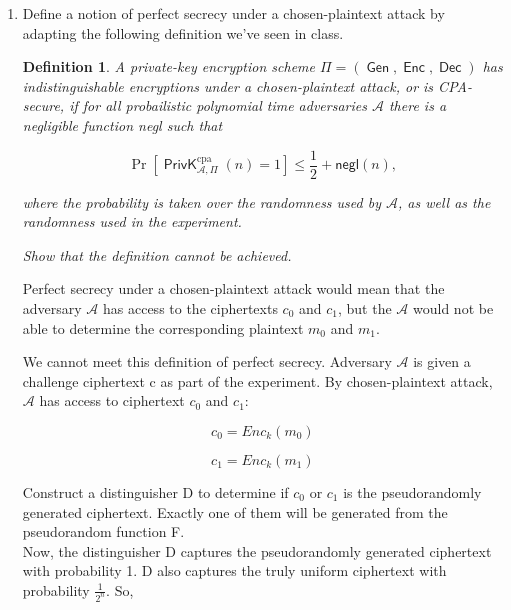 \documentclass{article}
\newtheorem{definition}{Definition}
\DeclareMathOperator{\PrivK}{\textsf{PrivK}}
\DeclareMathOperator{\Gen}{\textsf{Gen}}
\DeclareMathOperator{\Enc}{\textsf{Enc}}
\DeclareMathOperator{\Dec}{\textsf{Dec}}
\begin{document}
\begin{enumerate}
\begin{proof}
      Thus, we find an equivalent definition that $\mathcal{A}$ can only
      distinguish between the two encryption schemes with negligible
      probability.
    \end{proof}
  \item Define a notion of perfect secrecy under a chosen-plaintext attack by
    adapting the following definition we've seen in class.

    \begin{definition}
      \textit{A private-key encryption scheme $\Pi = (\Gen, \Enc,
        \Dec)$ has \textsf{indistinguishable encryptions under a
        chosen-plaintext attack}, or is \textsf{CPA-secure}, if for all
        probailistic polynomial time adversaries $\mathcal{A}$ there is a
      negligible function \textsf{negl} such that}

        \[
          \Pr\left[\PrivK_{\mathcal{A}, \Pi}^\text{cpa}(n) = 1\right] \leq
          \frac{1}{2} + \textsf{negl}(n),
        \]

        \textit{where the probability is taken over the randomness used by
        $\mathcal{A}$, as well as the randomness used in the experiment.}

        \textit{Show that the definition cannot be achieved.}
    \end{definition}

    Perfect secrecy under a chosen-plaintext attack would mean that the 
    adversary $\mathcal{A}$ has access to the ciphertexts $c_0$ and $c_1$, 
    but the $\mathcal{A}$ would not be able to determine the corresponding plaintext $m_0$ and $m_1$.  

    We cannot meet this definition of perfect secrecy. Adversary $\mathcal{A}$ is given a challenge ciphertext c as part of the experiment. By chosen-plaintext attack, $\mathcal{A}$ has access to ciphertext $c_0$ and $c_1$:

    \begin{equation}
        c_0 = Enc_k(m_0)
    \end{equation}

    \begin{equation}
        c_1 = Enc_k(m_1)
    \end{equation}

    Construct a distinguisher D to determine if $c_0$ or $c_1$ is the pseudorandomly generated ciphertext. Exactly one of them will be generated from the pseudorandom function F. \\
    
    Now, the distinguisher D captures the pseudorandomly generated ciphertext with probability 1. D also captures the truly uniform ciphertext with probability $\frac{1}{2^n}$. So,


\end{enumerate}
\end{document}
